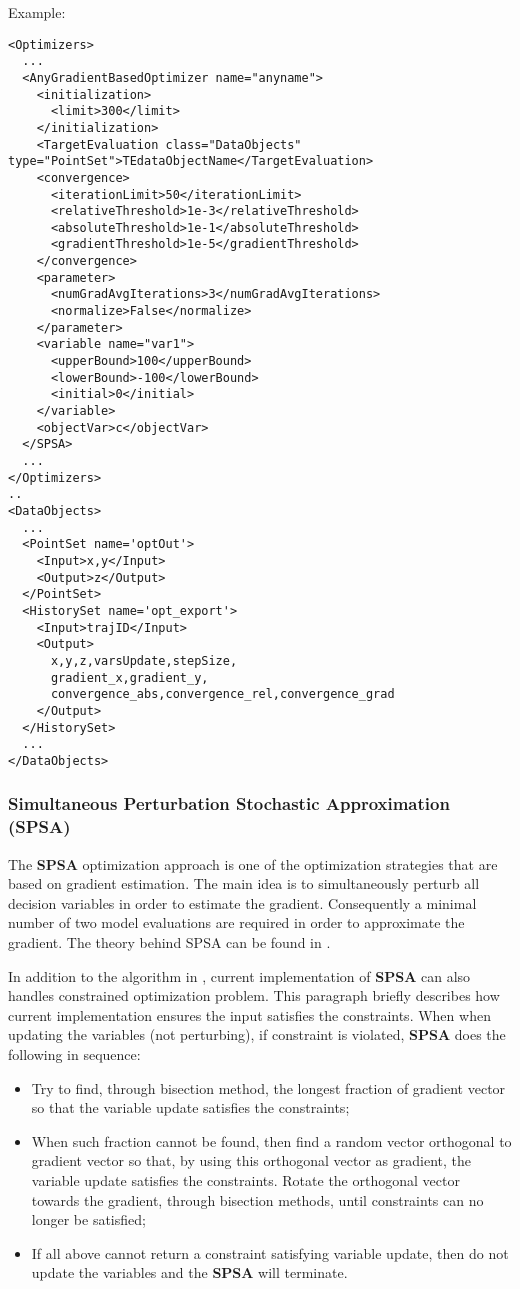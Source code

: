 Example:
\begin{lstlisting}[style=XML]
<Optimizers>
  ...
  <AnyGradientBasedOptimizer name="anyname">
    <initialization>
      <limit>300</limit>
    </initialization>
    <TargetEvaluation class="DataObjects" type="PointSet">TEdataObjectName</TargetEvaluation>
    <convergence>
      <iterationLimit>50</iterationLimit>
      <relativeThreshold>1e-3</relativeThreshold>
      <absoluteThreshold>1e-1</absoluteThreshold>
      <gradientThreshold>1e-5</gradientThreshold>
    </convergence>
    <parameter>
      <numGradAvgIterations>3</numGradAvgIterations>
      <normalize>False</normalize>
    </parameter>
    <variable name="var1">
      <upperBound>100</upperBound>
      <lowerBound>-100</lowerBound>
      <initial>0</initial>
    </variable>
    <objectVar>c</objectVar>
  </SPSA>
  ...
</Optimizers>
..
<DataObjects>
  ...
  <PointSet name='optOut'>
    <Input>x,y</Input>
    <Output>z</Output>
  </PointSet>
  <HistorySet name='opt_export'>
    <Input>trajID</Input>
    <Output>
      x,y,z,varsUpdate,stepSize,
      gradient_x,gradient_y,
      convergence_abs,convergence_rel,convergence_grad
    </Output>
  </HistorySet>
  ...
</DataObjects>
\end{lstlisting}

\subsubsection{Simultaneous Perturbation Stochastic Approximation (SPSA)}
\label{subsubsubsec:SPSA}
The \textbf{SPSA} optimization approach is one of the optimization strategies that are based on gradient estimation. The main
idea is to simultaneously perturb all decision variables in order to estimate the gradient. Consequently a minimal number of two
model evaluations are required in order to approximate the gradient. The theory behind SPSA can be found in
\cite{spall1998implementation}.

In addition to the algorithm in \cite{spall1998implementation}, current implementation of \textbf{SPSA} can also handles
constrained optimization problem. This paragraph briefly describes how current implementation ensures the input satisfies the
constraints. When when updating the variables (not perturbing), if constraint is violated, \textbf{SPSA} does the following in
sequence:
\begin{itemize}
\item Try to find, through bisection method, the longest fraction of gradient vector so that the variable update satisfies the
constraints;
\item When such fraction cannot be found, then find a random vector orthogonal to gradient vector so that, by using this
orthogonal vector as gradient, the variable update satisfies the constraints. Rotate the orthogonal vector towards the gradient,
through bisection methods, until constraints can no longer be satisfied;
\item If all above cannot return a constraint satisfying variable update, then do not update the variables and the \textbf{SPSA} will
terminate.
\end{itemize}

